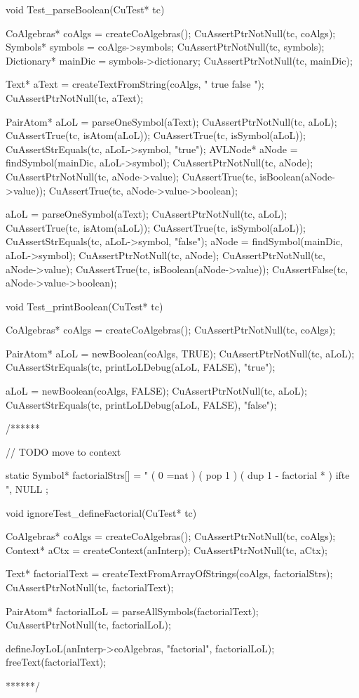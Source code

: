 void Test_parseBoolean(CuTest* tc) {
  CoAlgebras* coAlgs = createCoAlgebras();
  CuAssertPtrNotNull(tc, coAlgs);
  Symbols* symbols = coAlgs->symbols;
  CuAssertPtrNotNull(tc, symbols);
  Dictionary* mainDic = symbols->dictionary;
  CuAssertPtrNotNull(tc, mainDic);

  Text* aText = createTextFromString(coAlgs, " true false ");
  CuAssertPtrNotNull(tc, aText);

  PairAtom* aLoL = parseOneSymbol(aText);
  CuAssertPtrNotNull(tc, aLoL);
  CuAssertTrue(tc, isAtom(aLoL));
  CuAssertTrue(tc, isSymbol(aLoL));
  CuAssertStrEquals(tc, aLoL->symbol, "true");
  AVLNode* aNode = findSymbol(mainDic, aLoL->symbol);
  CuAssertPtrNotNull(tc, aNode);
  CuAssertPtrNotNull(tc, aNode->value);
  CuAssertTrue(tc, isBoolean(aNode->value));
  CuAssertTrue(tc, aNode->value->boolean);

  aLoL = parseOneSymbol(aText);
  CuAssertPtrNotNull(tc, aLoL);
  CuAssertTrue(tc, isAtom(aLoL));
  CuAssertTrue(tc, isSymbol(aLoL));
  CuAssertStrEquals(tc, aLoL->symbol, "false");
  aNode = findSymbol(mainDic, aLoL->symbol);
  CuAssertPtrNotNull(tc, aNode);
  CuAssertPtrNotNull(tc, aNode->value);
  CuAssertTrue(tc, isBoolean(aNode->value));
  CuAssertFalse(tc, aNode->value->boolean);
}

void Test_printBoolean(CuTest* tc) {
  CoAlgebras* coAlgs = createCoAlgebras();
  CuAssertPtrNotNull(tc, coAlgs);

  PairAtom* aLoL = newBoolean(coAlgs, TRUE);
  CuAssertPtrNotNull(tc, aLoL);
  CuAssertStrEquals(tc, printLoLDebug(aLoL, FALSE), "true");

  aLoL = newBoolean(coAlgs, FALSE);
  CuAssertPtrNotNull(tc, aLoL);
  CuAssertStrEquals(tc, printLoLDebug(aLoL, FALSE), "false");
}

/******

// TODO move to context

static Symbol* factorialStrs[] = {
  " ( 0 =nat ) ( pop 1 ) ( dup 1 - factorial * ) ifte ",
  NULL
};

void ignoreTest_defineFactorial(CuTest* tc) {
  CoAlgebras* coAlgs = createCoAlgebras();
  CuAssertPtrNotNull(tc, coAlgs);
  Context* aCtx = createContext(anInterp);
  CuAssertPtrNotNull(tc, aCtx);

  Text* factorialText = createTextFromArrayOfStrings(coAlgs, factorialStrs);
  CuAssertPtrNotNull(tc, factorialText);

  PairAtom* factorialLoL = parseAllSymbols(factorialText);
  CuAssertPtrNotNull(tc, factorialLoL);

  defineJoyLoL(anInterp->coAlgebras, "factorial", factorialLoL);
  freeText(factorialText);
}
******/

